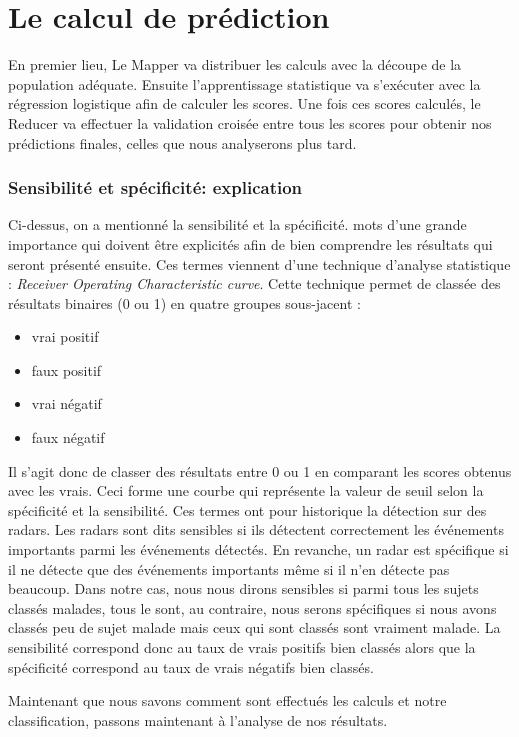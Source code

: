 \section{Le calcul de prédiction}


En premier lieu, Le Mapper va distribuer les calculs avec la découpe de la population adéquate.
Ensuite l'apprentissage statistique va s'exécuter avec la régression logistique afin de calculer les scores. 
Une fois ces scores calculés, le Reducer va effectuer la validation croisée entre tous les scores pour obtenir nos prédictions finales, celles que nous analyserons plus tard. 

\subsubsection{Sensibilité et spécificité: explication}

Ci-dessus, on a mentionné la sensibilité et la spécificité. mots d'une grande importance qui doivent être explicités afin de bien comprendre les résultats qui seront présenté ensuite. 
Ces termes viennent d'une technique d'analyse statistique : \textit{Receiver Operating Characteristic curve}. Cette technique  permet de classée des résultats binaires (0 ou 1) en quatre groupes sous-jacent : 
\begin{itemize}
	\item vrai positif
	\item faux positif
	\item vrai négatif
	\item faux négatif
\end{itemize}

Il s'agit donc de classer des résultats entre 0 ou 1 en comparant les scores obtenus avec les vrais. Ceci forme une courbe qui représente la valeur de seuil selon la spécificité et la sensibilité. 
Ces termes ont pour historique la détection sur des radars. Les radars sont dits sensibles si ils détectent correctement les événements importants parmi les événements détectés. En revanche, un radar est spécifique si il ne détecte que des événements importants même si il n'en détecte pas beaucoup.  
Dans notre cas, nous nous dirons sensibles si parmi tous les sujets classés malades, tous le sont, au contraire, nous serons spécifiques si nous avons classés peu de sujet malade mais ceux qui sont classés sont vraiment malade.
La sensibilité correspond donc au taux de vrais positifs bien classés alors que la spécificité correspond au taux de vrais négatifs bien classés.  


Maintenant que nous savons comment sont effectués les calculs et notre classification, passons maintenant à l'analyse de nos résultats. 
